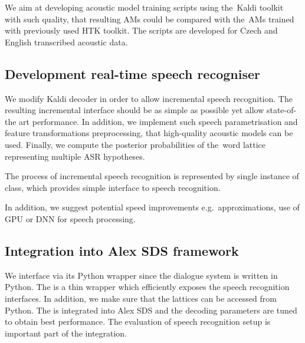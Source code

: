 We aim at developing acoustic model training scripts using the~Kaldi toolkit with such quality, that resulting \acp{AM} could be compared with the~\acp{AM} trained with previously used \ac{HTK} toolkit. 
The scripts are developed for Czech and English transcribed acoustic data.


\subsection{Development real-time speech recogniser} 
\label{sub:compare_rt}

We modify Kaldi  decoder in order to allow incremental speech recognition.
The resulting incremental interface should be as simple as possible yet allow state-of-the art performance.
In addition, we implement such speech parametrisation and feature transformations preprocessing, that high-quality acoustic models can be used.
Finally, we compute the posterior probabilities of the~word lattice representing multiple \ac{ASR} hypotheses.

The process of incremental speech recognition is represented by single instance of  class,
which provides simple interface to speech recognition.

In addition, we suggest potential speed improvements e.g.\ approximations, use of \ac{GPU} 
or \ac{DNN} for speech processing\cite{vesely2013sequencediscriminative}.

\subsection[Integration into Alex \acs{SDS} framework]{Integration into Alex \acl{SDS} framework} 
\label{sub:integration}
We interface  via its Python wrapper since the dialogue system is written in Python.
The  is a thin wrapper which efficiently exposes the speech recognition interfaces.
In addition, we make sure that the lattices can be accessed from Python.
The  is integrated into Alex \ac{SDS} and the decoding parameters are tuned to obtain best performance.
The evaluation of speech recognition setup is important part of the integration.

